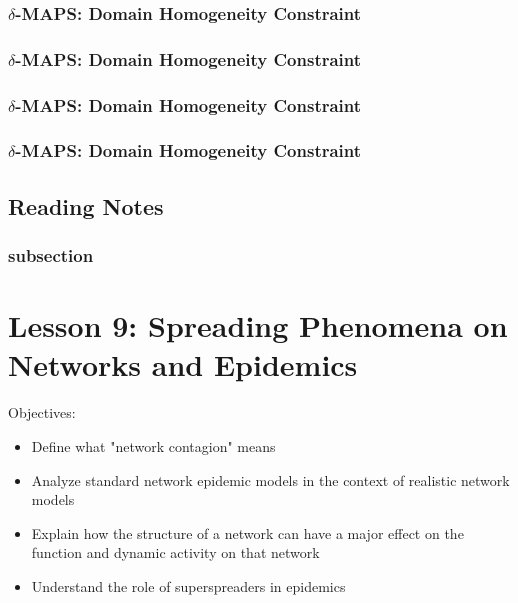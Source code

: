 \documentclass[11pt]{scrartcl} %
\begin{document}
\subsubsection{$\delta$-MAPS: Domain Homogeneity Constraint}
\subsubsection{$\delta$-MAPS: Domain Homogeneity Constraint}
\subsubsection{$\delta$-MAPS: Domain Homogeneity Constraint}
\subsubsection{$\delta$-MAPS: Domain Homogeneity Constraint}
\subsubsection{}

\subsection{Reading Notes}

\subsubsection{subsection}
\textbf{}


\section{Lesson 9: Spreading Phenomena on Networks and Epidemics}

Objectives:
\begin{itemize}
	\item Define what "network contagion" means
	\item Analyze standard network epidemic models in the context of realistic network models 
	\item Explain how the structure of a network can have a major effect on the function and dynamic activity on that network 
	\item Understand the role of superspreaders in epidemics
\end{itemize}
\end{document}
